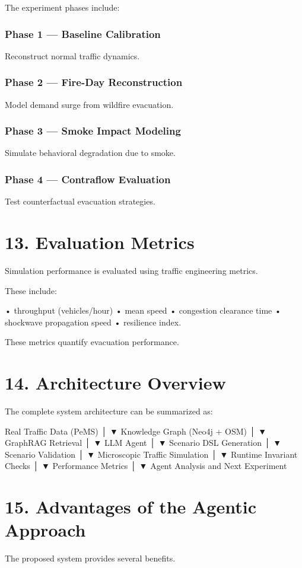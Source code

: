 The experiment phases include:

\subsection*{Phase 1 — Baseline Calibration}
Reconstruct normal traffic dynamics.

\subsection*{Phase 2 — Fire-Day Reconstruction}
Model demand surge from wildfire evacuation.

\subsection*{Phase 3 — Smoke Impact Modeling}
Simulate behavioral degradation due to smoke.

\subsection*{Phase 4 — Contraflow Evaluation}
Test counterfactual evacuation strategies.

\chapter*{13. Evaluation Metrics}
Simulation performance is evaluated using traffic engineering metrics.

These include:

• throughput (vehicles/hour)
• mean speed
• congestion clearance time
• shockwave propagation speed
• resilience index.

These metrics quantify evacuation performance.

\chapter*{14. Architecture Overview}
The complete system architecture can be summarized as:

Real Traffic Data (PeMS)
        │
        ▼
Knowledge Graph (Neo4j + OSM)
        │
        ▼
GraphRAG Retrieval
        │
        ▼
LLM Agent
        │
        ▼
Scenario DSL Generation
        │
        ▼
Scenario Validation
        │
        ▼
Microscopic Traffic Simulation
        │
        ▼
Runtime Invariant Checks
        │
        ▼
Performance Metrics
        │
        ▼
Agent Analysis and Next Experiment
\chapter*{15. Advantages of the Agentic Approach}
The proposed system provides several benefits.

